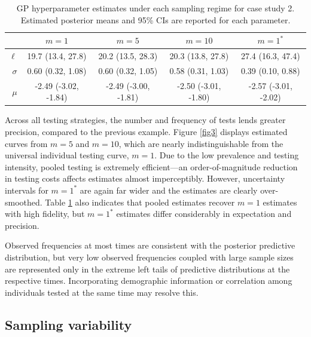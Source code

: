 \documentclass{article}
\begin{document}
\begin{table}[h]
\caption{GP hyperparameter estimates under each sampling regime for case study 2. Estimated posterior means and 95\% CIs are reported for each parameter.} \centering
\begin{tabular}{ r | c   c   c   c  } \toprule
        & $m=1$ & $m=5$ & $m=10$ &  $m=1^*$\\
\midrule
$\ell$ & 19.7 (13.4, 27.8) & 20.2 (13.5, 28.3)  & 20.3 (13.8, 27.8) & 27.4 (16.3, 47.4)   \\
$\sigma$ & 0.60 (0.32, 1.08) & 0.60 (0.32, 1.05) & 0.58 (0.31, 1.03)  & 0.39 (0.10, 0.88) \\
$\mu$ & -2.49 (-3.02, -1.84) &  -2.49 (-3.00, -1.81)  & -2.50 (-3.01, -1.80)  & -2.57 (-3.01, -2.02) \\
\bottomrule 
\end{tabular}
\label{t4}
\end{table}

Across all testing strategies, the number and frequency of tests lends greater precision, compared to the previous example. Figure \ref{fig3} displays estimated curves from $m=5$ and $m=10$, which are nearly indistinguishable from the universal individual testing curve, $m=1$. Due to the low prevalence and testing intensity, pooled testing is extremely efficient—an order-of-magnitude reduction in testing costs affects estimates almost imperceptibly. However, uncertainty intervals for $m=1^*$ are again far wider and the estimates are clearly over-smoothed. Table \ref{t4} also indicates that pooled estimates recover $m=1$ estimates with high fidelity, but $m=1^*$ estimates differ considerably in expectation and precision. 

Observed frequencies at most times are consistent with the posterior predictive distribution, but very low observed frequencies coupled with large sample sizes are represented only in the extreme left tails of predictive distributions at the respective times. Incorporating demographic information or correlation among individuals tested at the same time may resolve this.

\subsection{Sampling variability}
\end{document}
